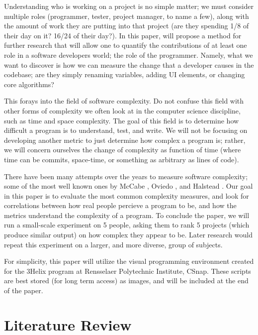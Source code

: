 \documentclass[]{article}
\begin{document}
Understanding who is working on a project is no simple matter; we must consider multiple roles (programmer, tester, project manager, to name a few), along with the amount of work they are putting into that project (are they spending 1/8 of their day on it? 16/24 of their day?).
In this paper, will propose a method for further research that will allow one to quantify the contributions of at least one role in a software developers world; the role of the programmer.
Namely, what we want to discover is how we can measure the change that a developer causes in the codebase; are they simply renaming variables, adding UI elements, or changing core algorithms?

This forays into the field of software complexity.
Do not confuse this field with other forms of complexity we often look at in the computer science discipline, such as time and space complexity.
The goal of this field is to determine how difficult a program is to understand, test, and write.
We will not be focusing on developing another metric to just determine how complex a program is; rather, we will concern ourselves the change of complexity as function of time (where time can be commits, space-time, or something as arbitrary as lines of code).

There have been many attempts over the years to measure software complexity; some of the most well known ones by McCabe \cite{ref:a_complexity_measure}, Oviedo \cite{ref:oviedo1993control}, and Halstead \cite{ref:halstead1977elements}.
Our goal in this paper is to evaluate the most common complexity measures, and look for correlations between how real people percieve a program to be, and how the metrics understand the complexity of a program.
To conclude the paper, we will run a small-scale experiment on 5 people, asking them to rank 5 projects (which produce similar output) on how complex they appear to be.
Later research would repeat this experiment on a larger, and more diverse, group of subjects.

For simplicity, this paper will utilize the visual programming environment created for the 3Helix program at Rensselaer Polytechnic Institute, CSnap.
These scripts are best stored (for long term access) as images, and will be included at the end of the paper.

\section{Literature Review}

\end{document}
